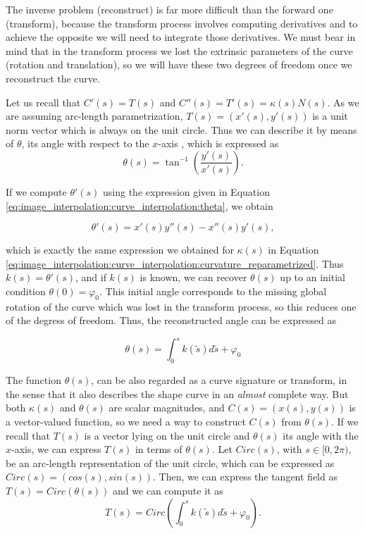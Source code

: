 \documentclass{ipol}
\begin{document}
The inverse problem (reconstruct) is far more difficult than the forward one (transform), because the transform process involves computing derivatives and to achieve the opposite we will need to integrate those derivatives. We must bear in mind that in the transform process we lost the extrinsic parameters of the curve (rotation and translation), so we will have these two degrees of freedom once we reconstruct the curve.

Let us recall that $C'(s)=T(s)$ and $C''(s)=T'(s)=\kappa(s)N(s)$. As we are assuming arc-length parametrization, $T(s)=(x'(s),y'(s))$ is a unit norm vector which is always on the unit circle. Thus we can describe it by means of $\theta$,  its angle with respect to the $x$-axis , which is expressed as
\begin{equation}
 \theta(s)=\tan^{-1}\left(\frac{y'(s)}{x'(s)}\right).
 \label{eq:image_interpolation:curve_interpolation:theta}
\end{equation}

If we compute $\theta'(s)$ using the expression given in Equation \ref{eq:image_interpolation:curve_interpolation:theta}, we obtain

\begin{equation}
 \theta'(s)=x'(s)y''(s)-x''(s)y'(s) ,
 \label{eq:image_interpolation:curve_interpolation:theta_prime}
\end{equation}

which is exactly the same expression we obtained for $\kappa(s)$ in Equation \ref{eq:image_interpolation:curve_interpolation:curvature_reparametrized}. Thus $k(s)=\theta'(s)$, and if $k(s)$ is known, we can recover $\theta(s)$ up to an initial condition $\theta(0)=\varphi_0$. This initial angle corresponds to the missing global rotation of the curve which was lost in the transform process, so this reduces one of the degress of freedom. Thus, the reconstructed angle can be expressed as

\begin{equation}
 \theta(s)=\int_0^s k(\tilde{s})d\tilde{s}+\varphi_0
  \label{eq:image_interpolation:curve_interpolation:angle_reconstruction_from_curvature}
\end{equation}

The function $\theta(s)$, can be also regarded as a curve signature or transform, in the sense that it also describes the shape curve in an \emph{almost} complete way. But both $\kappa(s)$ and $\theta(s)$ are scalar magnitudes, and $C(s)=(x(s),y(s))$ is a vector-valued function, so we need a way to construct $C(s)$ from $\theta(s)$. If we recall that $T(s)$ is a vector lying on the unit circle and $\theta(s)$ its angle with the $x$-axis, we can express $T(s)$ in terms of $\theta(s)$. Let $Circ(s)$, with $s\in[0,2\pi)$, be an arc-length representation of the unit circle, which can be expressed as $Circ(s)=(cos(s),sin(s))$. Then, we can express the tangent field as $T(s)=Circ(\theta(s))$ and we can compute it as
\begin{equation}
T(s)=Circ \left(\int_0^s k(\tilde{s})d\tilde{s}+\varphi_0 \right).
 \label{eq:image_interpolation:curve_interpolation:tangent_reconstruction}
\end{equation}
\end{document}
